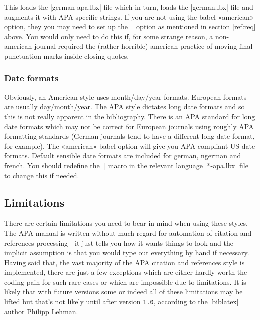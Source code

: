 \documentclass{ltxdockit}
\begin{document}
\begin{ltxcode}
\end{ltxcode}

This loads the |german-apa.lbx| file which in turn, loads the |german.lbx|
file and augments it with APA-specific strings. If you are not using the
babel «american» option, they you may need to set up the
|\DeclareQuotePunctuation| option as mentioned in section \ref{ref:req} above.
You would only need to do this if, for some strange reason, a non-american
journal required the (rather horrible) american practice of moving final
punctuation marks inside closing quotes.

\subsubsection{Date formats}

Obviously, an American style uses month/day/year formats. European formats
are usually day/month/year. The APA style dictates long date formats and so
this is not really apparent in the bibliography. There is an APA standard
for long date formats which may not be correct for European journals using
roughly APA formatting standards (German journals tend to have a different
long date format, for example). The «american» babel option will give you
APA compliant US date formats. Default sensible date formats are included
for german, ngerman and french. You should redefine the |\mkbibdatelong|
macro in the relevant language |*-apa.lbx| file to change this if needed.

\subsection{Limitations}
\label{use:limit}
There are certain limitations you need to bear in mind when using these
styles. The APA manual is written without much regard for automation of
citation and references processing---it just tells you how it wants things to
look and the implicit assumption is that you would type out everything by
hand if necessary. Having said that, the vast majority of the APA citation
and references style is implemented, there are just a few exceptions which
are either hardly worth the coding pain for such rare cases or which are
impossible due to  limitations. It is likely that with future
 versions some or indeed all of these limitations may be
lifted but that's not likely until after  version
\texttt{1.0}, according to the |biblatex| author Philipp Lehman.
\end{document}

